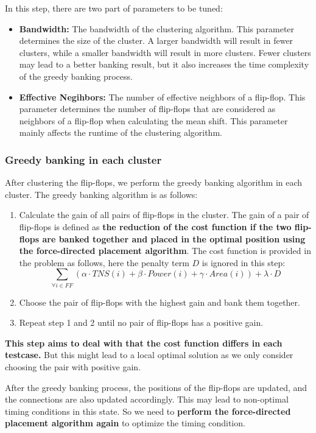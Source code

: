 \documentclass[12pt]{article}
\begin{document}
In this step, there are two part of parameters to be tuned:
\begin{itemize}
    \item \textbf{Bandwidth:} The bandwidth of the clustering algorithm. This parameter determines the size of the cluster. A larger bandwidth will result in fewer clusters, while a smaller bandwidth will result in more clusters. Fewer clusters may lead to a better banking result, but it also increases the time complexity of the greedy banking process.
    \item \textbf{Effective Negihbors:} The number of effective neighbors of a flip-flop. This parameter determines the number of flip-flops that are considered as neighbors of a flip-flop when calculating the mean shift. This parameter mainly affects the runtime of the clustering algorithm.
\end{itemize}

\subsubsection{Greedy banking in each cluster}

After clustering the flip-flops, we perform the greedy banking algorithm in each cluster. The greedy banking algorithm is as follows:

\begin{enumerate}
    \item Calculate the gain of all pairs of flip-flops in the cluster. The gain of a pair of flip-flops is defined as \textbf{the reduction of the cost function if the two flip-flops are banked together and placed in the optimal position using the force-directed placement algorithm}. The cost function is provided in the problem as follows, here the penalty term $D$ is ignored in this step:
    $$
    \sum_{\forall i \in FF}(\alpha \cdot TNS(i) + \beta \cdot Power(i) + \gamma \cdot Area(i)) + \lambda \cdot D
    $$
    \item Choose the pair of flip-flops with the highest gain and bank them together.
    \item Repeat step 1 and 2 until no pair of flip-flops has a positive gain.
\end{enumerate}

\textbf{This step aims to deal with that the cost function differs in each testcase.} But this might lead to a local optimal solution as we only consider choosing the pair with positive gain.

After the greedy banking process, the positions of the flip-flops are updated, and the connections are also updated accordingly. This may lead to non-optimal timing conditions in this state. So we need to \textbf{perform the force-directed placement algorithm again} to optimize the timing condition.
\end{document}
